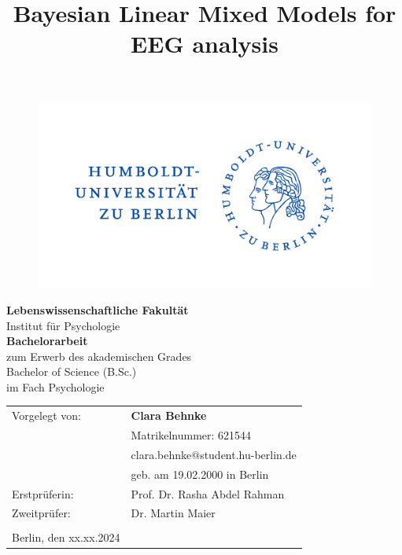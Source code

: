 \documentclass[
  doc,12pt,floatsintext]{apa7}
\title{Bayesian Linear Mixed Models for EEG analysis}
\author{\phantom{0}}
\date{}
\affiliation{\phantom{0}}
\begin{document}
\maketitle

\vspace{-20mm}
\begin{center}
\begin{figure}[h]
\begin{center}
\includegraphics[width=!,totalheight=!,scale=0.2]{auxiliary_files/hu_logo}
\end{center}
\end{figure}
\vspace*{5mm}
{
\textbf{Lebenswissenschaftliche Fakultät}\\
Institut für Psychologie\\
\vspace*{10mm}
}
{
\textbf{Bachelorarbeit}\\
zum Erwerb des akademischen Grades \\
Bachelor of Science (B.Sc.)\\
im Fach Psychologie\\
\vspace*{10mm}
}
\end{center}
\begin{flushleft}
{
\begin{tabular}{ll}
Vorgelegt von:&\textbf{Clara Behnke}\\
&Matrikelnummer: 621544\\
&clara.behnke$@$student.hu-berlin.de\\
&geb. am 19.02.2000 in Berlin\\
Erstprüferin:&Prof. Dr. Rasha Abdel Rahman\\
Zweitprüfer:&Dr. Martin Maier\\
&\\
Berlin, den xx.xx.2024&\\
\end{tabular}
}
\end{flushleft}
\end{document}
